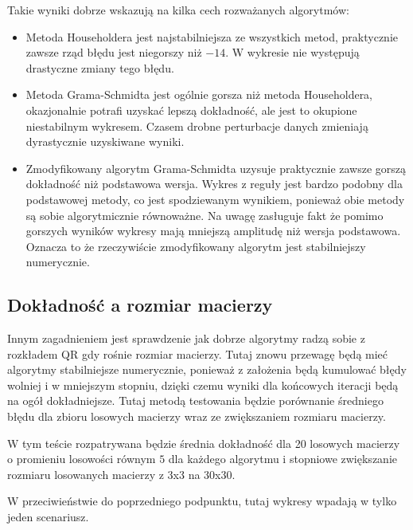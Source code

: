 \documentclass[11pt,wide]{mwart}
\begin{document}
Takie wyniki dobrze wskazują na kilka cech rozważanych algorytmów:
\newline
\begin{itemize}
    \item Metoda Householdera jest najstabilniejsza ze wszystkich metod, praktycznie zawsze rząd błędu jest niegorszy niż $-14$. W wykresie nie występują drastyczne zmiany tego błędu.
    \newline
    \item Metoda Grama-Schmidta jest ogólnie gorsza niż metoda Householdera, okazjonalnie potrafi uzyskać lepszą dokładność, ale jest to okupione niestabilnym wykresem. Czasem drobne perturbacje danych zmieniają dyrastycznie uzyskiwane wyniki.
    \newline
    \item Zmodyfikowany algorytm Grama-Schmidta uzysuje praktycznie zawsze gorszą dokładność niż podstawowa wersja. Wykres z reguły jest bardzo podobny dla podstawowej metody, co jest spodziewanym wynikiem, ponieważ obie metody są sobie algorytmicznie równoważne. Na uwagę zasługuje fakt że pomimo gorszych wyników wykresy mają mniejszą amplitudę niż wersja podstawowa. Oznacza to że rzeczywiście zmodyfikowany algorytm jest stabilniejszy numerycznie.
    \newline
\end{itemize}



\subsection{Dokładność a rozmiar macierzy}

Innym zagadnieniem jest sprawdzenie jak dobrze algorytmy radzą sobie z rozkładem QR gdy rośnie rozmiar macierzy. Tutaj znowu przewagę będą mieć algorytmy stabilniejsze numerycznie, ponieważ z założenia będą kumulować błędy wolniej i w mniejszym stopniu, dzięki czemu wyniki dla końcowych iteracji będą na ogół dokładniejsze. Tutaj metodą testowania będzie porównanie średniego błędu dla zbioru losowych macierzy wraz ze zwiększaniem rozmiaru macierzy.

W tym teście rozpatrywana będzie średnia dokładność dla 20 losowych macierzy o promieniu losowości równym $5$ dla każdego algorytmu i stopniowe zwiększanie rozmiaru losowanych macierzy z 3x3 na 30x30. 

W przeciwieństwie do poprzedniego podpunktu, tutaj wykresy wpadają w tylko jeden scenariusz.
\end{document}
